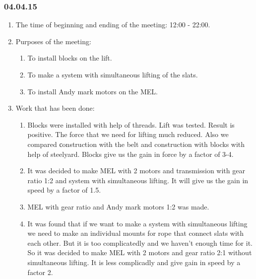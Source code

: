 \subsubsection{04.04.15}
\begin{enumerate}
	
	\item The time of beginning and ending of the meeting: 12:00 - 22:00.
	
	\item Purposes of the meeting: 
	\begin{enumerate}
		
		\item To install blocks on the lift.
		
		\item To make a system with simultaneous lifting of the slats.
		
        \item To install Andy mark motors on the MEL.
		
	\end{enumerate}

	\item Work that has been done:
	\begin{enumerate}
		
		\item Blocks were installed with help of threads. Lift was tested. Result is positive. The force that we need for lifting much reduced. Also we compared сonstruction with the belt and construction with blocks with help of steelyard. Blocks give us the gain in force by a factor of 3-4.   
		
		\item It was decided to make MEL with 2 motors and transmission with gear ratio 1:2 and system with simultaneous lifting. It will give us the gain in speed by a factor of 1.5.
		
		\item MEL with gear ratio and Andy mark motors 1:2 was made.
		
        \item It was found that if we want to make a system with simultaneous lifting we need to make an individual mounts for rope that connect slats with each other. But it is too complicatedly and we haven't enough time for it. So it was decided to make MEL with 2 motors and gear ratio 2:1 without simultaneous lifting. It is less complicadly and give gain in speed by a factor 2. 

	\end{enumerate}
	

\end{enumerate}
